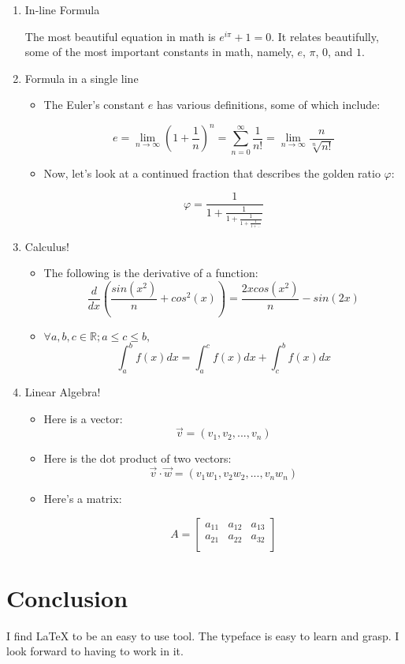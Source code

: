 \documentclass{article}
\begin{document}
\begin{enumerate}
    \item In-line Formula

    The most beautiful equation in math is $e^{i\pi} + 1 = 0$. It relates beautifully, some of the most important constants in math, namely, $e$, $\pi$, $0$, and $1$.

    \item Formula in a single line

    \begin{itemize}
        \item The Euler's constant $e$ has various definitions, some of which include:

        $$e = \lim_{n \to \infty} \left(1 + \frac{1}{n} \right) ^ n = \sum_{n=0}^{\infty}\frac{1}{n!} = \lim_{n \to \infty} \frac{n}{\sqrt[n]{n!}}$$

        \item Now, let's look at a continued fraction that describes the golden ratio $\varphi$:

        $$\varphi = \frac{1}{1 + \frac{1}{1 + \frac{1}{1 + \frac{1}{1 + \ldots}}}}$$

    \end{itemize}

    \item Calculus!

    \begin{itemize}
        \item The following is the derivative of a function:
        $$\frac{d}{dx} \left( \frac{sin(x^2)}{n} + cos^2(x) \right) = \frac{2x cos(x^2)}{n} - sin(2x)$$

        \item
        $\forall a, b, c \in \mathbb{R}; a \leq c \leq b,$
        $$\int_a^bf(x) dx = \int_a^cf(x) dx + \int_c^bf(x) dx$$

    \end{itemize}

    \item Linear Algebra!

    \begin{itemize}
        \item Here is a vector:
        $$\vec{v} = (v_1, v_2, ..., v_n)$$

        \item Here is the dot product of two vectors:
        $$\vec{v} \cdot \vec{w} = (v_1 w_1, v_2w_2, ..., v_nw_n)$$

        \item Here's a matrix:

        $$A = \begin{bmatrix}
            a_{11} & a_{12} & a_{13} \\
            a_{21} & a_{22} & a_{32} \\
        \end{bmatrix}$$

    \end{itemize}

\end{enumerate}

\section*{Conclusion}

I find LaTeX to be an easy to use tool. The typeface is easy to learn and grasp. I look forward to having to work in it.
\end{document}
